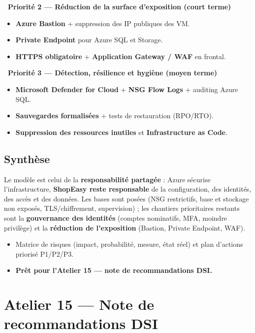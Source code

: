\documentclass[11pt,a4paper]{article}
\newcommand{\emo}[1]{\raisebox{-0.14em}{\twemoji{#1}}}
\newcommand{\eOrange}{\emo{1f7e0}}
\newcommand{\eYellow}{\emo{1f7e1}}
\begin{document}
\textbf{\eOrange~Priorité 2 — Réduction de la surface d'exposition (court terme)}
\begin{itemize}
  \item \textbf{Azure Bastion} + suppression des IP publiques des VM.
  \item \textbf{Private Endpoint} pour Azure SQL et Storage.
  \item \textbf{HTTPS obligatoire} + \textbf{Application Gateway / WAF} en frontal.
\end{itemize}

\textbf{\eYellow~Priorité 3 — Détection, résilience et hygiène (moyen terme)}
\begin{itemize}
  \item \textbf{Microsoft Defender for Cloud} + \textbf{NSG Flow Logs} + auditing Azure SQL.
  \item \textbf{Sauvegardes formalisées} + tests de restauration (RPO/RTO).
  \item \textbf{Suppression des ressources inutiles} et \textbf{Infrastructure as Code}.
\end{itemize}

\subsection{Synthèse}
Le modèle est celui de la \textbf{responsabilité partagée} : Azure sécurise l'infrastructure, \textbf{ShopEasy
reste responsable} de la configuration, des identités, des accès et des données. Les bases sont posées (NSG
restrictifs, base et stockage non exposés, TLS/chiffrement, supervision) ; les chantiers prioritaires restants
sont la \textbf{gouvernance des identités} (comptes nominatifs, MFA, moindre privilège) et la \textbf{réduction
de l'exposition} (Bastion, Private Endpoint, WAF).

\begin{etatbox}
\begin{itemize}
  \item Matrice de risques (impact, probabilité, mesure, état réel) et plan d'actions priorisé P1/P2/P3.
  \item \textbf{Prêt pour l'Atelier 15 — note de recommandations DSI.}
\end{itemize}
\end{etatbox}


\section{Atelier 15 — Note de recommandations DSI}
\end{document}
